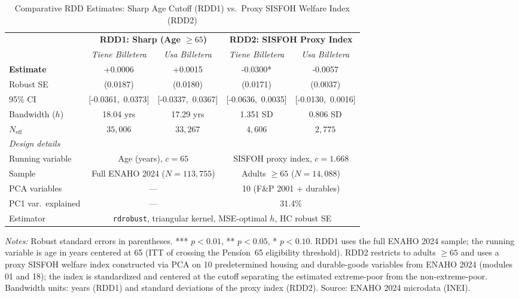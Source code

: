 \begin{table}[htbp]
  \centering
  \caption{Comparative RDD Estimates: Sharp Age Cutoff (RDD1) vs.\ Proxy SISFOH Welfare Index (RDD2)}
  \label{tab:rdd_comparativa}
  \small
  \begin{tabular}{l cc cc}
    \toprule
    & \multicolumn{2}{c}{\textbf{RDD1: Sharp (Age $\geq 65$)}} & \multicolumn{2}{c}{\textbf{RDD2: SISFOH Proxy Index}} \\
    \cmidrule(lr){2-3}\cmidrule(lr){4-5}
    & \textit{Tiene Billetera} & \textit{Usa Billetera} & \textit{Tiene Billetera} & \textit{Usa Billetera} \\
    \midrule
    \textbf{Estimate} & +0.0006 & +0.0015 & -0.0300* & -0.0057 \\
    Robust SE & (0.0187) & (0.0180) & (0.0171) & (0.0037) \\
    95\% CI & [-0.0361,\ 0.0373] & [-0.0337,\ 0.0367] & [-0.0636,\ 0.0035] & [-0.0130,\ 0.0016] \\
    \addlinespace
    Bandwidth ($h$) & 18.04 yrs & 17.29 yrs & 1.351 SD & 0.806 SD \\
    $N_{\mathrm{eff}}$ & $35{,}006$ & $33{,}267$ & $4{,}606$ & $2{,}775$ \\
    \midrule
    \multicolumn{5}{l}{\textit{Design details}} \\
    Running variable & \multicolumn{2}{c}{Age (years), $c = 65$} & \multicolumn{2}{c}{SISFOH proxy index, $c = 1.668$} \\
    Sample & \multicolumn{2}{c}{Full ENAHO 2024 ($N=113{,}755$)} & \multicolumn{2}{c}{Adults $\geq 65$ ($N=14{,}088$)} \\
    PCA variables & \multicolumn{2}{c}{---} & \multicolumn{2}{c}{10 (F\&P 2001 + durables)} \\
    PC1 var.\ explained & \multicolumn{2}{c}{---} & \multicolumn{2}{c}{31.4\%} \\
    Estimator & \multicolumn{4}{c}{\texttt{rdrobust}, triangular kernel, MSE-optimal $h$, HC robust SE} \\
    \bottomrule
  \end{tabular}
  \begin{minipage}{\linewidth}
    \smallskip\footnotesize
    \textit{Notes:} Robust standard errors in parentheses.
    *** $p<0.01$, ** $p<0.05$, * $p<0.10$.
    RDD1 uses the full ENAHO 2024 sample; the running variable is age in years centered at 65 (ITT of crossing the Pens\'ion~65 eligibility threshold).
    RDD2 restricts to adults $\geq 65$ and uses a proxy SISFOH welfare index constructed via PCA on 10 predetermined housing and durable-goods variables from ENAHO 2024 (modules 01 and 18); the index is standardized and centered at the cutoff separating the estimated extreme-poor from the non-extreme-poor.
    Bandwidth units: years (RDD1) and standard deviations of the proxy index (RDD2). Source: ENAHO 2024 microdata (INEI).
  \end{minipage}
\end{table}